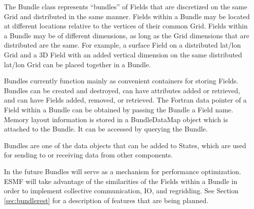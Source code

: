 
The Bundle class represents ``bundles'' of Fields that are 
discretized on the same Grid and distributed in the same manner.  
Fields within a Bundle may be located at different locations relative 
to the vertices of their common Grid.  Fields within a Bundle may
be of different dimensions, as long as the Grid dimensions that 
are distributed are the same.  For example, a surface Field on 
a distributed lat/lon Grid and a 3D Field with an added vertical 
dimension on the same distributed lat/lon Grid can be placed together
in a Bundle.
 
Bundles currently function mainly as convenient containers for storing 
Fields.  Bundles can be created and destroyed, can have attributes 
added or retrieved, and can have Fields added, removed, or retrieved.  
The Fortran data pointer of a Field within a Bundle can be obtained 
by passing the Bundle a Field name.  Memory layout information is 
stored in a BundleDataMap object which is attached to the Bundle.  It 
can be accessed by querying the Bundle.

Bundles are one of the data objects that can be added to States,
which are used for sending to or receiving data from other components.

In the future Bundles will serve as a mechanism for performance
optimization.  ESMF will take advantage of the similarities of the
Fields within a Bundle in order to implement collective communication,
IO, and regridding.  See Section \ref{sec:bundlerest} for a 
description of features that are being planned.





